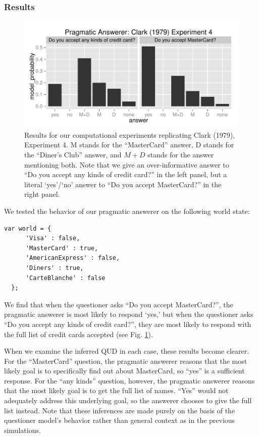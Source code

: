 \documentclass[12pt, floatsintext, jou]{apa6}
\begin{document}
\subsubsection{Results}
  \begin{figure}[t!]
  \begin{center}
\includegraphics[scale = .7]{creditCardPlot.jpeg}
\end{center}
\vspace{-.25cm}
\caption{Results for our computational experiments replicating Clark (1979), Experiment 4. M stands for the ``MasterCard'' answer, D stands for the ``Diner's Club'' answer, and $M+D$ stands for the answer mentioning both. Note that we give an over-informative answer to ``Do you accept any kinds of credit card?'' in the left panel, but a literal `yes'/`no' answer to ``Do you accept MasterCard?'' in the right panel.}
\label{fig:creditCardExperimentResults}
\end{figure}


We tested the behavior of our pragmatic answerer on the following world state:

\begin{lstlisting}
var world = {
      'Visa' : false,
      'MasterCard' : true,
      'AmericanExpress' : false,
      'Diners' : true,
      'CarteBlanche' : false
  };
\end{lstlisting}

We find that when the questioner asks ``Do you accept MasterCard?'', the pragmatic answerer is most likely to respond `yes,' but when the questioner asks ``Do you accept any kinds of credit card?'', they are most likely to respond with the full list of credit cards accepted (see Fig. \ref{fig:creditCardExperimentResults}). 

When we examine the inferred QUD in each case, these results become clearer. For the ``MasterCard'' question, the pragmatic answerer reasons that the most likely goal is to specifically find out about MasterCard, so ``yes'' is a sufficient response. For the ``any kinds'' question, however, the pragmatic answerer reasons that the most likely goal is to get the full list of names. ``Yes'' would not adequately address this underlying goal, so the answerer chooses to give the full list instead. Note that these inferences are made purely on the basis of the questioner model's behavior rather than general context as in the previous simulations.
\end{document}
